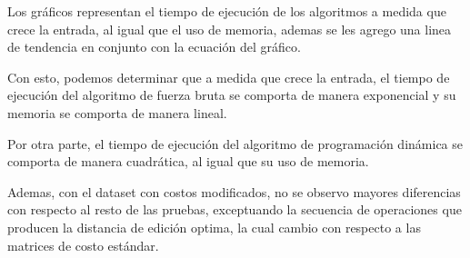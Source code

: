 \begin{enumerate}
\begin{figure}[H]

    \end{figure}

    Los gráficos representan el tiempo de ejecución de los algoritmos
    a medida que crece la entrada, al igual que el uso de memoria, ademas
    se les agrego una linea de tendencia en conjunto con la ecuación del
    gráfico.

    Con esto, podemos determinar que a medida que crece la entrada,
    el tiempo de ejecución del algoritmo de fuerza bruta 
    se comporta de manera exponencial y su memoria se comporta
    de manera lineal.

    Por otra parte, el tiempo de ejecución del algoritmo de programación
    dinámica se comporta de manera cuadrática, al igual que su uso de 
    memoria.

    Ademas, con el dataset con costos modificados, no se observo mayores
    diferencias con respecto al resto de las pruebas, exceptuando la secuencia
    de operaciones que producen la distancia de edición optima, la cual
    cambio con respecto a las matrices de costo estándar.


\end{enumerate}















